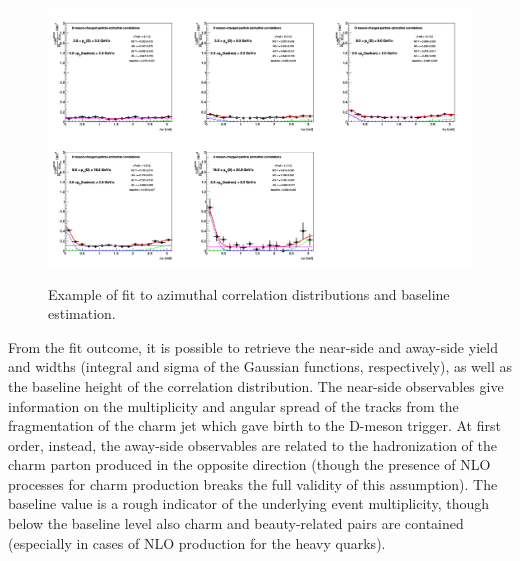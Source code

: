 \begin{figure}[h]
\centering
{\includegraphics[width=0.99\linewidth, height=0.70\linewidth]{figures/Fits/cFitting_0_pthad2dot0to3dot0.png}}

\caption{Example of fit to azimuthal correlation distributions and baseline estimation.}
 \label{fig:ExFit}
 \end{figure}

From the fit outcome, it is possible to retrieve the near-side and away-side yield and widths (integral and sigma of the Gaussian functions, respectively), as well as the baseline height of the correlation distribution. The near-side observables give information on the multiplicity and angular spread of the tracks from the fragmentation of the charm jet which gave birth to the D-meson trigger. At first order, instead, the away-side observables are related to the hadronization of the charm parton produced in the opposite direction (though the presence of NLO processes for charm production breaks the full validity of this assumption). The baseline value is a rough indicator of the underlying event multiplicity, though below the baseline level also charm and beauty-related pairs are contained (especially in cases of NLO production for the heavy quarks).

